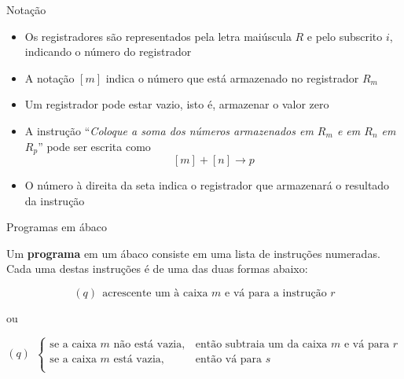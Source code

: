 \begin{frame}[fragile]{Notação}

    \begin{itemize}
        \item Os registradores são representados pela letra maiúscula $R$ e pelo subscrito $i$,
            indicando o número do registrador

        \item A notação $[m]$ indica o número que está armazenado no registrador $R_m$

        \item Um registrador pode estar vazio, isto é, armazenar o valor zero

        \item A instrução ``{\it Coloque a soma dos números armazenados em $R_m$ e em $R_n$ em 
            $R_p$}'' pode ser escrita como
        \[
            [m] + [n] \to p
        \]

        \item O número à direita da seta indica o registrador que armazenará o resultado da
            instrução
    \end{itemize}

\end{frame}

\begin{frame}[fragile]{Programas em ábaco}

    Um \textbf{programa} em um ábaco consiste em uma lista de instruções numeradas. Cada
    uma destas instruções é de uma das duas formas abaixo:

    \begin{small}
    \vspace{0.2in}

    \[
        (q)\ \ \mbox{acrescente um à caixa $m$ e vá para a instrução $r$}
    \]
    \end{small}

    \vspace{0.1in}
    ou
    \vspace{0.1in}

    \begin{small}
    \[
        (q)\ \ \left\lbrace \begin{array}{ll}
            \mbox{se a caixa $m$ não está vazia},& \mbox{então subtraia um da caixa $m$ e vá para $r$}\\
            \mbox{se a caixa $m$ está vazia},& \mbox{então vá para $s$}\\
        \end{array}\right.
    \]
    \end{small}

\end{frame}

